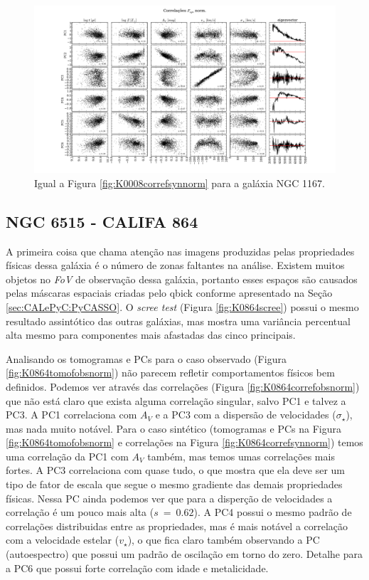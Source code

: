 \begin{figure}
    \includegraphics[width=1.3\textwidth, angle=-90]{figuras/K0119-correl-f_syn_norm-PCvsPhys.pdf}
	\caption[Correlações PCs vs. par\^ametros f\'isicos - $F_{syn}$ norm. - NGC 1167.]
	{Igual a Figura \ref{fig:K0008correfsynnorm} para a galáxia NGC 1167.}
    \label{fig:K0119correfsynnorm}
\end{figure}

\subsection{NGC 6515 - CALIFA 864}

A primeira coisa que chama atenção nas imagens produzidas pelas propriedades físicas dessa galáxia é o número de zonas
faltantes na análise. Existem muitos objetos no {\em FoV} de observação dessa galáxia, portanto esses espaços são
causados pelas máscaras espaciais criadas pelo qbick conforme apresentado na Seção \ref{sec:CALePyC:PyCASSO}. O {\em
scree test} (Figura \ref{fig:K0864scree}) possui o mesmo resultado assintótico das outras galáxias, mas mostra uma
variância percentual alta mesmo para componentes mais afastadas das cinco principais.

Analisando os tomogramas e PCs para o caso observado (Figura \ref{fig:K0864tomofobsnorm}) não parecem refletir
comportamentos físicos bem definidos. Podemos ver através das correlações (Figura \ref{fig:K0864correfobsnorm}) que não
está claro que exista alguma correlação singular, salvo PC1 e talvez a PC3. A PC1 correlaciona com $A_V$ e a PC3 com a
dispersão de velocidades ($\sigma_\star$), mas nada muito notável. Para o caso sintético (tomogramas e PCs na Figura
\ref{fig:K0864tomofobsnorm} e correlações na Figura \ref{fig:K0864correfsynnorm}) temos uma correlação da PC1 com $A_V$
também, mas temos umas correlações mais fortes. A PC3 correlaciona com quase tudo, o que mostra que ela deve ser um tipo
de fator de escala que segue o mesmo gradiente das demais propriedades físicas. Nessa PC ainda podemos ver que para a
disperção de velocidades a correlação é um pouco mais alta ($s\ =\ 0.62$). A PC4 possui o mesmo padrão de correlações
distribuidas entre as propriedades, mas é mais notável a correlação com a velocidade estelar ($v_\star$), o que fica
claro também observando a PC (autoespectro) que possui um padrão de oscilação em torno do zero. Detalhe para a PC6 que
possui forte correlação com idade e metalicidade.

